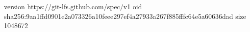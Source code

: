 version https://git-lfs.github.com/spec/v1
oid sha256:9aa1ffd0901e2a073326a10feee297ef4a27933a267f885fffc64e5a60636dad
size 1048672
